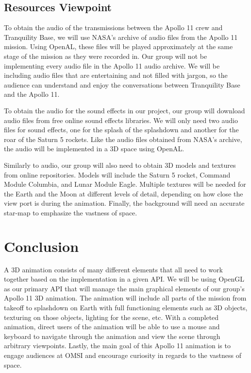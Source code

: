 \documentclass[onecolumn, draftclsnofoot,10pt, compsoc]{IEEEtran}
\begin{document}
    \subsection{Resources Viewpoint}
    To obtain the audio of the transmissions between the Apollo 11 crew and Tranquility Base, we will use NASA's archive of audio files from the Apollo 11 mission. Using OpenAL, these files will be played approximately at the same stage of the mission as they were recorded in. Our group will not be implementing every audio file in the Apollo 11 audio archive. We will be including audio files that are entertaining and not filled with jargon, so the audience can understand and enjoy the conversations between Tranquility Base and the Apollo 11.
    
    To obtain the audio for the sound effects in our project, our group will download audio files from free online sound effects libraries. We will only need two audio files for sound effects, one for the splash of the splashdown and another for the roar of the Saturn 5 rockets. Like the audio files obtained from NASA's archive, the audio will be implemented in a 3D space using OpenAL. 

    Similarly to audio, our group will also need to obtain 3D models and textures from online repositories. Models will include the Saturn 5 rocket, Command Module Columbia, and Lunar Module Eagle. Multiple textures will be needed for the Earth and the Moon at different levels of detail, depending on how close the view port is during the animation. Finally, the background will need an accurate star-map to emphasize the vastness of space. 
    
\section{Conclusion}
A 3D animation consists of many different elements that all need to work together based on the implementation in a given API. We will be using OpenGL as our primary API that will manage the main graphical elements of our group's Apollo 11 3D animation. The animation will include all parts of the mission from takeoff to splashdown on Earth with full functioning elements such as 3D objects, texturing on those objects, lighting for the scene, etc. With a completed animation, direct users of the animation will be able to use a mouse and keyboard to navigate through the animation and view the scene through arbitrary viewpoints. Lastly, the main goal of this Apollo 11 animation is to engage audiences at OMSI and encourage curiosity in regards to the vastness of space. 
\end{document}
